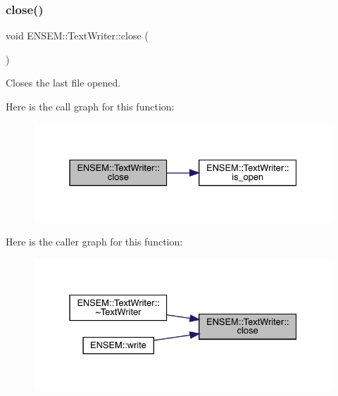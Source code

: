 \subsubsection{\texorpdfstring{close()}{close()}\hspace{0.1cm}{\footnotesize\ttfamily [1/2]}}
{\footnotesize\ttfamily void E\+N\+S\+E\+M\+::\+Text\+Writer\+::close (\begin{DoxyParamCaption}{ }\end{DoxyParamCaption})}



Closes the last file opened. 

Here is the call graph for this function\+:\nopagebreak
\begin{figure}[H]
\begin{center}
\leavevmode
\includegraphics[width=331pt]{db/d53/classENSEM_1_1TextWriter_a8b65ccb4936fe8b05492e4f30983b7ee_cgraph}
\end{center}
\end{figure}
Here is the caller graph for this function\+:\nopagebreak
\begin{figure}[H]
\begin{center}
\leavevmode
\includegraphics[width=331pt]{db/d53/classENSEM_1_1TextWriter_a8b65ccb4936fe8b05492e4f30983b7ee_icgraph}
\end{center}
\end{figure}
\mbox{\label{classENSEM_1_1TextWriter_a8b65ccb4936fe8b05492e4f30983b7ee}} 
